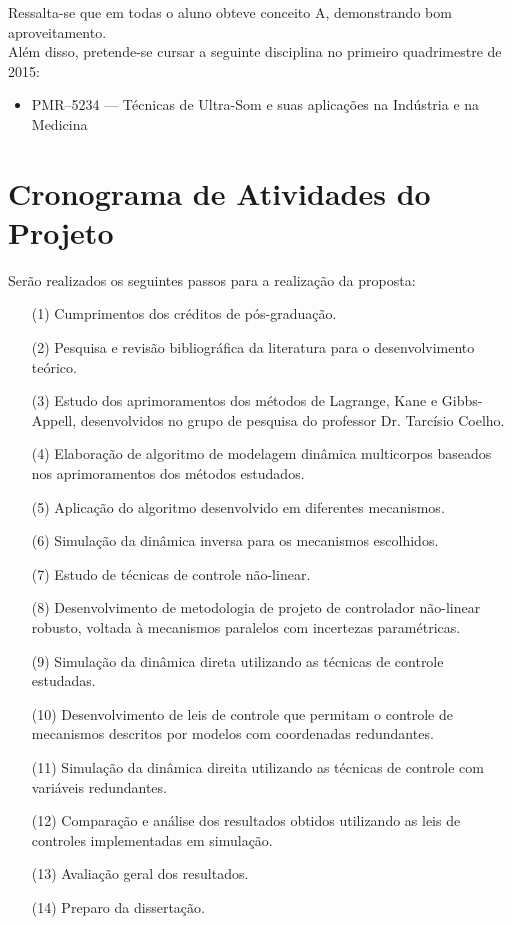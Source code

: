 \documentclass[a4paper,11pt,brazil,fleqn]{article}
\begin{document}
Ressalta-se que em todas o aluno obteve conceito A, demonstrando bom aproveitamento. \\

Al\'em disso, pretende-se cursar a seguinte disciplina no primeiro quadrimestre de 2015:
\begin{itemize}
\item PMR--5234 --- T\'ecnicas de Ultra-Som e suas aplica\c{c}\~oes na Ind\'ustria e na Medicina
\end{itemize}

\section{Cronograma de Atividades do Projeto}\label{S07}

Ser\~ao realizados os seguintes passos para a realiza\c{c}\~ao da proposta:

\begin{itemize}
\item[(1)] 	Cumprimentos dos cr\'editos de p\'os-gradua\c{c}\~ao.
\item[(2)] 	Pesquisa e revis\~ao bibliogr\'afica da literatura para o desenvolvimento te\'orico.
\item[(3)] 	Estudo dos aprimoramentos dos m\'etodos de Lagrange, Kane e Gibbs-Appell, desenvolvidos no grupo de pesquisa do professor Dr. Tarc\'isio Coelho.
\item[(4)]  Elabora\c{c}\~ao de algoritmo de modelagem din\^amica multicorpos baseados nos aprimoramentos dos m\'etodos estudados.
\item[(5)] 	Aplica\c{c}\~ao do algoritmo desenvolvido em diferentes mecanismos.
\item[(6)] 	Simula\c{c}\~ao da din\^amica inversa para os mecanismos escolhidos.
\item[(7)]  Estudo de t\'ecnicas de controle n\~ao-linear.
\item[(8)]  Desenvolvimento de metodologia de projeto de controlador n\~ao-linear robusto, voltada \`a mecanismos paralelos com incertezas param\'etricas.
\item[(9)] 	Simula\c{c}\~ao da din\^amica direta utilizando as t\'ecnicas de controle estudadas.
\item[(10)] 	Desenvolvimento de leis de controle que permitam  o controle de mecanismos descritos por modelos  com coordenadas redundantes.
\item[(11)] Simula\c{c}\~ao da din\^amica direita utilizando as t\'ecnicas de controle com vari\'aveis redundantes.
\item[(12)] 	Compara\c{c}\~ao e an\'alise dos resultados obtidos utilizando as leis de controles implementadas em simula\c{c}\~ao.
\item[(13)] 	Avalia\c{c}\~ao geral dos resultados.
\item[(14)] Preparo da disserta\c{c}\~ao.
\end{itemize}
\end{document}
